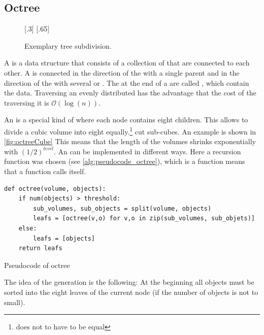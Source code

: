 \subsection{Octree}
% 
\begin{figure}[!t]
    \centering
    [.3\textwidth]{
    \def\tikzheight{0.6\textwidth}
    }\hfill
    [.65\textwidth]{
    \def\tikzheight{0.6\textwidth}
    }
	\caption{Exemplary tree subdivision.}
	\label{fig:octree}
\end{figure}
% 
A  is a data structure that consists of a collection of  that are connected to each other.
A  is connected in the direction of the  with a single parent  and in the direction of the  with several  or .
The  at the end of a  are called , which contain the data.
Traversing an evenly distributed  has the advantage that the cost of the traversing it is $\mathcal{O}(\log(n))$.
\par
% 
An  is a special kind of  where each node contains eight children.
This allows to divide a cubic volume into eight equally.\footnote{does not to have to be equal} cut sub-cubes.
An example is shown in \cref{fig:octreeCube}
This means that the length of the volumes shrinks exponentially with $(1/2)^\mathit{level}$.
An  can be implemented in different ways.
Here a recursion function was chosen (see \cref{alg:pseudocode_octree}), which is a function means that a function calls itself.
% 
\begin{lstfloat}[!tb]
\lstset{style=python}
\begin{lstlisting}[]
def octree(volume, objects):
    if num(objects) > threshold:
        sub_volumes, sub_objects = split(volume, objects)
        leafs = [octree(v,o) for v,o in zip(sub_volumes, sub_objets)]
    else:
        leafs = [objects]
    return leafs
\end{lstlisting}
\caption{Pseudocode of octree}
\label{alg:pseudocode_octree}
\end{lstfloat}
% 
The idea of the  generation is the following:
At the beginning all objects must be sorted into the eight leaves of the current node (if the number of objects is not to small).
